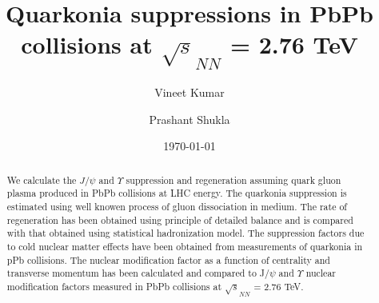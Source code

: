 \documentclass[aps,prc,preprint,superscriptaddress,showpacs,showkeys]{revtex4-1}
\begin{document}
\title{{\Large Quarkonia suppressions in PbPb collisions at $\sqrt s_{NN}$ =  2.76 TeV }}
\author{\large Vineet Kumar}
\author{\large Prashant Shukla}
\date{\today}


\begin{abstract}
 We calculate the $J/\psi$ and $\Upsilon$ suppression and regeneration assuming quark gluon plasma
produced in PbPb collisions at LHC energy. The quarkonia suppression is estimated using well knowen 
process of gluon dissociation in medium. The rate of regeneration has been obtained 
using principle of detailed balance and is compared with that obtained using statistical hadronization 
model. The suppression factors due to cold nuclear matter effects 
have been obtained from measurements of quarkonia in pPb collisions.
  The nuclear modification factor as a function of centrality and transverse momentum has been calculated  
and compared to J/$\psi$ and $\Upsilon$ nuclear modification factors measured in PbPb collisions 
at $\sqrt s_{NN}$ =  2.76 TeV.
\end{abstract}

\maketitle


\end{document}

